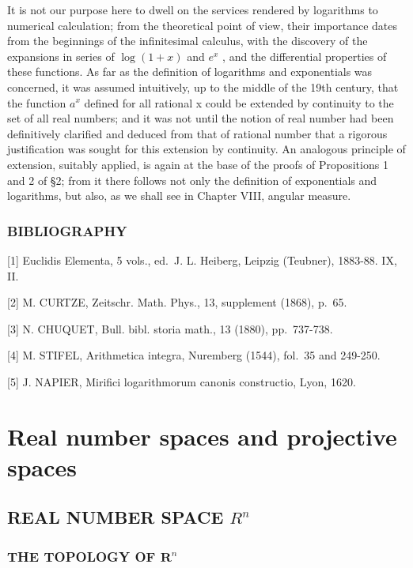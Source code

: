 It is not our purpose here to dwell on the services rendered by logarithms to numerical calculation; from the theoretical point of view, their importance dates from the beginnings of the infinitesimal calculus, with the discovery of the expansions in series of \(\log(1+x)\) and \(e^{x}\) , and the differential properties of these functions. As far as the definition of logarithms and exponentials was concerned, it was assumed intuitively, up to the middle of the 19th century, that the function \(a^{x}\) defined for all rational x could be extended by continuity to the set of all real numbers; and it was not until the notion of real number had been definitively clarified and deduced from that of rational number that a rigorous justification was sought for this extension by continuity. An analogous principle of extension, suitably applied, is again at the base of the proofs of Propositions 1 and 2 of §2; from it there follows not only the definition of exponentials and logarithms, but also, as we shall see in Chapter VIII, angular measure.

\subsection*{BIBLIOGRAPHY}

{[}1{]} Euclidis Elementa, 5 vols., ed.~J. L. Heiberg, Leipzig (Teubner), 1883-88. IX, II.

{[}2{]} M. CURTZE, Zeitschr. Math. Phys., 13, supplement (1868), p.~65.

{[}3{]} N. CHUQUET, Bull. bibl. storia math., 13 (1880), pp.~737-738.

{[}4{]} M. STIFEL, Arithmetica integra, Nuremberg (1544), fol.~35 and 249-250.

{[}5{]} J. NAPIER, Mirifici logarithmorum canonis constructio, Lyon, 1620.

\chapter{Real number spaces and projective spaces}

\section{\texorpdfstring{REAL NUMBER SPACE \(R^{n}\)}{REAL NUMBER SPACE R TO THE N}}

\subsection{\texorpdfstring{THE TOPOLOGY OF \(\mathbf{R}^n\)}{THE TOPOLOGY OF R TO THE N}}


